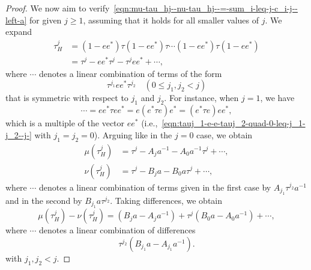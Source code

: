 \documentclass[reqno]{amsart}
\theoremstyle{plain} \newtheorem{theorem} {Theorem} \newtheorem{conjecture} {Conjecture} \newtheorem{corollary} [theorem] {Corollary} \newtheorem{proposition} [theorem] {Proposition} \newtheorem{fact} [theorem] {Fact}
\theoremstyle{definition} \newtheorem{definition} [theorem] {Definition}
\theoremstyle{itplain} %
\begin{document}
\begin{proof}
  We now aim to verify~\eqref{eqn:mu-tau_hj--nu-tau_hj--=-sum_i-leq-j-c_i-j--left-a} for given $j \geq 1$, assuming that it holds for all smaller values of $j$.  We expand
  \begin{align*}
    \tau_H^j &= (1 - e e^*) \tau (1 - e e^\ast) \tau \dotsb (1 - e e^*) \tau (1 - e e^*) \\
             &=
               \tau^j - e e^* \tau^j - \tau^j e e^* + \dotsb,
  \end{align*}
  where $\dotsb$ denotes a linear combination of terms of the form
  \begin{equation}\label{eqn:tauj_1-e-e-tauj_2-quad-0-leq-j_1-j_2--j-}
    \tau^{j_1} e e^* \tau^{j_2} \quad (0 \leq j_1, j_2 < j)
  \end{equation}
  that is symmetric with respect to $j_1$ and $j_2$.  For instance, when $j = 1$, we have
  \begin{equation*}
    \dotsb =
    e e^\ast \tau e e^\ast
    =
    e (e^\ast \tau e) e^\ast
    =
    (e^* \tau e) e e^*,
  \end{equation*}
  which is a multiple of the vector $e e^\ast$ (i.e.,~\eqref{eqn:tauj_1-e-e-tauj_2-quad-0-leq-j_1-j_2--j-} with $j_1 = j_2 = 0$).  Arguing like in the $j=0$ case, we obtain
  \begin{align}\label{eqn:20230516005320}
    \mu(\tau_H^j) &= \tau^j - A_j a^{-1} - A_0 a^{-1} \tau ^j + \dotsb, \\  \nonumber
    \nu(\tau_H^j) &= \tau^j - B_j a - B_0 a \tau ^j + \dotsb,
  \end{align}
  where $\dotsb$ denotes a linear combination of terms given in the first case by $A_{j_1} \tau^{j_2} a^{-1}$ and in the second by $B_{j_1} a \tau^{j_2}$.  Taking differences, we obtain
  \begin{equation*}
    \mu(\tau_H^j) - \nu(\tau_H^j) = (B_j a - A_j a^{-1} ) + \tau^j (B_0 a -  A_0 a^{-1}) + \dotsb,
  \end{equation*}
  where $\dotsb$ denotes a linear combination of differences
  \begin{equation*}
    \tau^{j_2} (B_{j_1} a - A_{j_1} a^{-1}).
  \end{equation*}
  with $j_1,j_2 < j$.
\end{proof}
\end{document}
